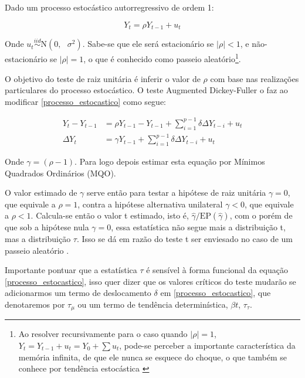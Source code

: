 \documentclass[a4paper,
               article,
               12pt,
               openany,
               oneside,
               english,
               brazil]{abntex2}
\numberwithin{equation}{section}
\begin{document}
    Dado um processo estocástico autorregressivo de ordem 1:

    \begin{equation}\label{processo_estocastico} Y_t = \rho Y_{t-1} + u_t \end{equation}

    Onde $ u_t \stackrel{iid}{\sim} \text{N}(0,\text{ }\sigma^2) $. Sabe-se que ele será estacionário se $ \lvert \rho \rvert < 1 $, e não-estacionário se $ \lvert \rho \rvert = 1 $, o que é conhecido como passeio aleatório\footnote{Ao resolver recursivamente para o caso quando $ \lvert \rho \rvert = 1 $, $ Y_t = Y_{t-1} + u_t = Y_0 + \sum u_t $, pode-se perceber a importante característica da memória infinita, de que ele nunca se esquece do choque, o que também se conhece por tendência estocástica \cite[p.~736]{gujarati}}.

    O objetivo do teste de raiz unitária é inferir o valor de $ \rho $ com base nas realizações particulares do processo estocástico. O teste Augmented Dickey-Fuller o faz ao modificar \eqref{processo_estocastico} como segue:

    \begin{align}
        \label{adf}
        Y_t - Y_{t-1} &= \rho Y_{t-1} - Y_{t-1} + \sum_{i = 1}^{p-1}\delta \Delta Y_{t-i} + u_t \nonumber \\
        \Delta Y_t &= \gamma Y_{t-1} + \sum_{i = 1}^{p-1}\delta \Delta Y_{t-i} + u_t
    \end{align}

    Onde $ \gamma = (\rho - 1) $. Para logo depois estimar esta equação por Mínimos Quadrados Ordinários (MQO).
   
    O valor estimado de $ \gamma $ serve então para testar a hipótese de raiz unitária $ \gamma = 0 $, que equivale a $ \rho = 1 $, contra a hipótese alternativa unilateral $ \gamma < 0 $, que equivale a $ \rho < 1 $. Calcula-se então o valor t estimado, isto é, $ \hat{\gamma} / \text{EP}(\hat{\gamma}) $, com o porém de que sob a hipótese nula $ \gamma = 0 $, essa estatística não segue mais a distribuição t, mas a distribuição $ \tau $. Isso se dá em razão do teste t ser enviesado no caso de um passeio aleatório \cite[p.~748-749]{gujarati}.

    Importante pontuar que a estatística $ \tau $ é sensível à forma funcional da equação \eqref{processo_estocastico}, isso quer dizer que os valores críticos do teste mudarão se adicionarmos um termo de deslocamento $ \delta $ em \eqref{processo_estocastico}, que denotaremos por $ \tau_{\mu} $ ou um termo de tendência determinística, $ \beta t $, $ \tau_{\tau} $.
   
\end{document}
